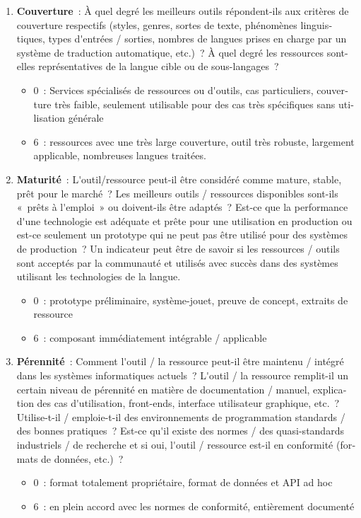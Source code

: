 \begin{french}
\begin{multicols}{2}
\begin{enumerate}
\item {\bf Couverture}~: À quel degré les meilleurs outils répondent-ils aux critères de couverture respectifs (styles, genres, sortes de texte, phénomènes linguistiques, types d{\mbox '}entrées / sorties, nombres de langues prises en charge par un système de traduction automatique, etc.)~? À quel degré les ressources sont-elles représentatives de la langue cible ou de sous-langages~? 
      \begin{itemize}
      \item 0~: Services spécialisés de ressources ou d{\mbox '}outils, cas particuliers, couverture très faible, seulement utilisable pour des cas très spécifiques sans utilisation générale
      \item 6~: ressources avec une très large couverture, outil très robuste, largement applicable, nombreuses langues traitées.
      \end{itemize}

\item {\bf Maturité}~: L{\mbox '}outil/ressource peut-il être considéré comme mature, stable, prêt pour le marché~? Les meilleurs outils / ressources disponibles sont-ils «~prêts à l{\mbox '}emploi~» ou doivent-ils être adaptés~? Est-ce que la performance d{\mbox '}une technologie est adéquate et prête pour une utilisation en production ou est-ce seulement un prototype qui ne peut pas être utilisé pour des systèmes de production~? Un indicateur peut être de savoir si les ressources / outils sont acceptés par la communauté et utilisés avec succès dans des systèmes utilisant les technologies de la langue.  
     \begin{itemize}
      \item 0~: prototype préliminaire, système-jouet, preuve de concept, extraits de ressource
      \item 6~: composant immédiatement intégrable / applicable
      \end{itemize}

\item {\bf Pérennité}~: Comment l{\mbox '}outil / la ressource peut-il être maintenu / intégré dans les systèmes informatiques actuels~? L{\mbox '}outil / la ressource remplit-il un certain niveau de pérennité en matière de documentation / manuel, explication des cas d{\mbox '}utilisation, front-ends, interface utilisateur graphique, etc.~? Utilise-t-il / emploie-t-il des environnements de programmation standards / des bonnes pratiques~? Est-ce qu{\mbox '}il existe des normes / des quasi-standards industriels / de recherche et si oui, l{\mbox '}outil / ressource est-il en conformité (formats de données, etc.)~? 
      \begin{itemize}
      \item 0~: format totalement propriétaire, format de données et API ad hoc
      \item 6~: en plein accord avec les normes de conformité, entièrement documenté
      \end{itemize}


\end{enumerate}
\end{multicols}
\end{french}
